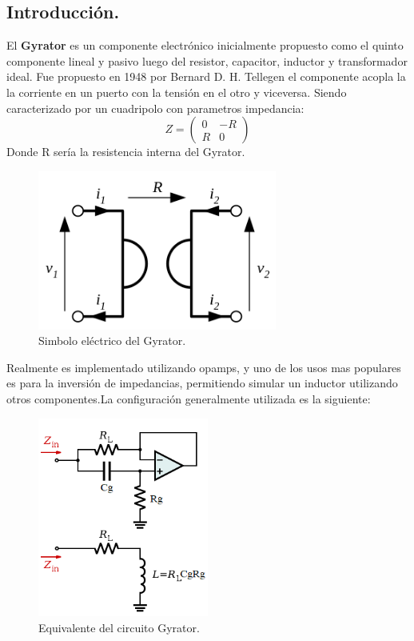 \documentclass[a4paper]{article}
\begin{document}
\subsection{Introducción.}
El \textbf{Gyrator} es un componente electrónico inicialmente propuesto como el quinto componente lineal y pasivo luego del resistor, capacitor, inductor y transformador ideal. Fue propuesto en 1948 por Bernard D. H. Tellegen el componente acopla la la corriente en un puerto con la tensión en el otro y viceversa. Siendo caracterizado por un cuadripolo con parametros impedancia:
$$ Z= \left(\begin{matrix}0&-R\\R&0\end{matrix}\right) $$
Donde R sería la resistencia interna del Gyrator.

\begin{figure}[H]	
	\centering
	\includegraphics[width=0.7\textwidth]{ImagenesEj2/gyratorsimb.png}
	\caption{Simbolo eléctrico del Gyrator.}
	\label{fig:gyrsimb}
\end{figure}
Realmente es implementado utilizando opamps, y uno de los usos mas populares es para la inversión de impedancias, permitiendo simular un inductor utilizando otros componentes.La configuración generalmente utilizada es la siguiente:
\begin{figure}[H]	
	\centering
	\includegraphics[width=0.5\textwidth]{ImagenesEj2/gyrop.png}
	\caption{Equivalente del circuito Gyrator.}
	\label{fig:gyrop}
\end{figure}
\end{document}
